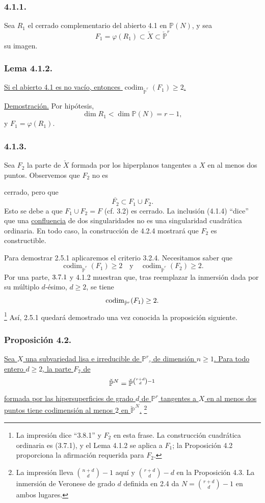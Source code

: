 \subsubsection*{4.1.1.}
Sea $R_1$ el cerrado complementario del abierto 4.1 en $\mathbb P(N)$,
y sea
\[
F_1=\varphi(R_1)\subset\check X\subset\check{\mathbb P}^{r}
\]
su imagen.

\subsubsection*{Lema 4.1.2.}
\underline{Si el abierto 4.1 es no vacío, entonces
$\operatorname{codim}_{\check{\mathbb P}^{r}}(F_1)\geq2$.}

\noindent\underline{Demostración.}
Por hipótesis,
\[
\dim R_1<\dim\mathbb P(N)=r-1,
\]
y $F_1=\varphi(R_1)$.

\subsubsection*{4.1.3.}
Sea $F_2$ la parte de $\check X$ formada por los hiperplanos tangentes
a $X$ en al menos dos puntos. Observemos que $F_2$ no es

\pageoriginale

cerrado, pero que
\begin{equation}\tag{4.1.4}
\overline{F_2}\subset F_1\cup F_2.
\end{equation}
Esto se debe a que $F_1\cup F_2=F$ (cf. 3.2) es cerrado. La inclusión
(4.1.4) ``dice'' que una \underline{confluencia} de dos singularidades
no es una singularidad cuadrática ordinaria. En todo caso, la
construcción de 4.2.4 mostrará que $F_2$ es constructible.

Para demostrar 2.5.1 aplicaremos el criterio 3.2.4. Necesitamos saber
que
\[
\operatorname{codim}_{\check{\mathbb P}^{r}}(F_1)\geq2
\quad\text{y}\quad
\operatorname{codim}_{\check{\mathbb P}^{r}}(F_2)\geq2.
\]
Por una parte, $\sisi{3.8.1}{3.7.1}$ y 4.1.2 muestran que, tras
reemplazar la inmersión dada por su múltiplo $d$-ésimo, $d\geq2$, se
tiene
\[
\operatorname{codim}_{\check{\mathbb P}^{r}}
(\sisi{F_2}{F_1})\geq2.
\]
\footnote{La impresión dice ``3.8.1'' y $F_2$ en esta frase. La
construcción cuadrática ordinaria es (3.7.1), y el Lema 4.1.2 se
aplica a $F_1$; la Proposición 4.2 proporciona la afirmación requerida
para $F_2$.}
Así, 2.5.1 quedará demostrado una vez conocida la proposición
siguiente.

\subsubsection*{Proposición 4.2.}
\underline{Sea $X$ una subvariedad lisa e irreducible de
$\mathbb P^r$, de dimensión $n\geq1$. Para todo entero $d\geq2$, la
parte $F_2$ de}
\[
\check{\mathbb P}^{N}
=\check{\mathbb P}^{\binom{\sisi{n}{r}+d}{d}-1}
\]
\underline{formada por las hipersuperficies de grado $d$ de
$\mathbb P^r$ tangentes a $X$ en al menos dos puntos tiene
codimensión al menos $2$ en $\check{\mathbb P}^{N}$.}
\footnote{La impresión lleva $\binom{n+d}{d}-1$ aquí y
$\binom{r+d}{d}-d$ en la Proposición 4.3. La inmersión de Veronese de
grado $d$ definida en 2.4 da
$N=\binom{r+d}{d}-1$ en ambos lugares.}

